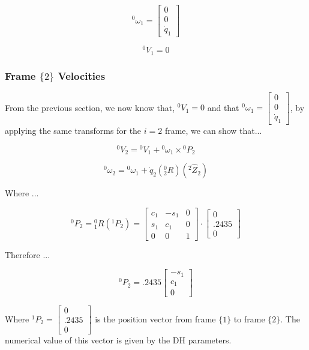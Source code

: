 $$
{}^{0}\omega_1 = \left[\begin{array}{c} 0 \\  0 \\ \dot{q}_{1} \end{array}\right]
$$

$$
{}^{0}V_{1} = 0
$$




\subsubsection*{Frame $\{ 2 \}$ Velocities}

From the previous section, we now know that, $ {}^{0}V_{1} = 0$ and that $ {}^{0}\omega_1 = \left[\begin{array}{c} 0 \\  0 \\ \dot{q}_{1} \end{array}\right]$, by applying the same transforms for the $i=2$ frame, we can show that...

$$
{}^{0}V_{2} = {}^{0}V_{1} + {}^{0}\omega_{1} \times {}^{0}P_{2}
$$

$$
{}^{0}\omega_2 = {}^{0}\omega_{1} + \dot{q}_{2} \left( {}^{0}_{2}R \right) \left( {}^{2}\hat{Z}_{2}\right)
$$



\noindent Where ...

$$
{}^{0}P_{2} = {}^{0}_{1}R\left({}^{1}P_2\right) = \begin{bmatrix} c_1 &-s_1 & 0 \\ s_1 & c_1 & 0 \\ 0 & 0 & 1\end{bmatrix} \cdot \begin{bmatrix} 0 \\ .2435 \\ 0 \end{bmatrix}
$$

\noindent Therefore ...

$$
{}^{0}P_{2} = .2435 \begin{bmatrix} -s_1 \\ c_1 \\ 0
\end{bmatrix}
$$

\noindent Where ${}^{1}P_2 = \begin{bmatrix} 0 \\ .2435 \\ 0 \end{bmatrix}$ is the position vector from frame $\{ 1 \}$ to frame $\{ 2 \}$. The numerical value of this vector is given by the DH parameters.





